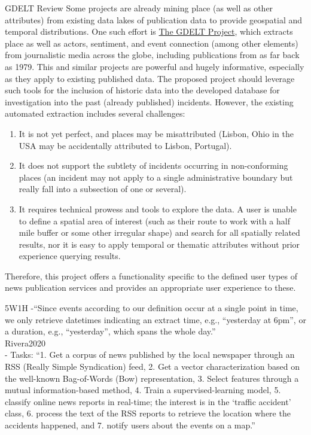 {GDELT} {\color{red}Review}
Some projects are already mining place (as well as other attributes) from existing data lakes of publication data to provide geospatial and temporal distributions. One such effort is \href{https://www.gdeltproject.org/}{The GDELT Project}, which extracts place as well as actors, sentiment, and event connection (among other elements) from journalistic media across the globe, including publications from as far back as 1979. This and similar projects are powerful and hugely informative, especially as they apply to existing published data. The proposed project should leverage such tools for the inclusion of historic data into the developed database for investigation into the past (already published) incidents. However, the existing automated extraction includes several challenges:
\begin{enumerate}
	\item It is not yet perfect, and places may be misattributed (Lisbon, Ohio in the USA may be accidentally attributed to Lisbon, Portugal).
	\item It does not support the subtlety of incidents occurring in non-conforming places (an incident may not apply to a single administrative boundary but really fall into a subsection of one or several).
	\item It requires technical prowess and tools to explore the data. A user is unable to define a spatial area of interest (such as their route to work with a half mile buffer or some other irregular shape) and search for all spatially related results, nor it is easy to apply temporal or thematic attributes without prior experience querying results. 
\end{enumerate}
Therefore, this project offers a functionality specific to the defined user types of news publication services and provides an appropriate user experience to these.

{5W1H}
-{\color{orange}“Since events according to our definition occur  at a single point in time, we only retrieve datetimes indicating an extract time, e.g., “yesterday at 6pm”, or a duration, e.g., “yesterday”, which spans the whole day.”\cite{Hamborg2019}}\\

{Rivera2020}\\
-{\color{orange} Tasks: “1. Get a corpus of news published by the local newspaper through an RSS (Really Simple Syndication) feed, 2. Get a vector characterization based on the well-known Bag-of-Words (Bow) representation, 3. Select features through a mutual information-based method, 4. Train a supervised-learning model, 5. classify online news reports in real-time; the interest is in the ‘traffic accident’ class, 6. process the text of the RSS reports to retrieve the location where the accidents happened, and 7. notify users about the events on a map.”\cite{Rivera2020}}\\

